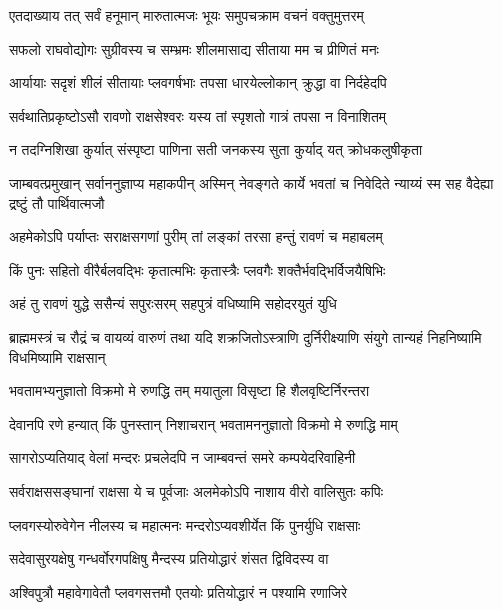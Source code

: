
\twolineshloka
{एतदाख्याय तत् सर्वं हनूमान् मारुतात्मजः}
{भूयः समुपचक्राम वचनं वक्तुमुत्तरम्} %

\twolineshloka
{सफलो राघवोद्योगः सुग्रीवस्य च सम्भ्रमः}
{शीलमासाद्य सीताया मम च प्रीणितं मनः} %

\twolineshloka
{आर्यायाः सदृशं शीलं सीतायाः प्लवगर्षभाः}
{तपसा धारयेल्लोकान् क्रुद्धा वा निर्दहेदपि} %

\twolineshloka
{सर्वथातिप्रकृष्टोऽसौ रावणो राक्षसेश्वरः}
{यस्य तां स्पृशतो गात्रं तपसा न विनाशितम्} %

\twolineshloka
{न तदग्निशिखा कुर्यात् संस्पृष्टा पाणिना सती}
{जनकस्य सुता कुर्याद् यत् क्रोधकलुषीकृता} %

\threelineshloka
{जाम्बवत्प्रमुखान् सर्वाननुज्ञाप्य महाकपीन्}
{अस्मिन् नेवङ्गते कार्ये भवतां च निवेदिते}
{न्याय्यं स्म सह वैदेह्या द्रष्टुं तौ पार्थिवात्मजौ} %

\twolineshloka
{अहमेकोऽपि पर्याप्तः सराक्षसगणां पुरीम्}
{तां लङ्कां तरसा हन्तुं रावणं च महाबलम्} %

\twolineshloka
{किं पुनः सहितो वीरैर्बलवद्भिः कृतात्मभिः}
{कृतास्त्रैः प्लवगैः शक्तैर्भवद्भिर्विजयैषिभिः} %

\twolineshloka
{अहं तु रावणं युद्धे ससैन्यं सपुरःसरम्}
{सहपुत्रं वधिष्यामि सहोदरयुतं युधि} %

\threelineshloka
{ब्राह्ममस्त्रं च रौद्रं च वायव्यं वारुणं तथा}
{यदि शक्रजितोऽस्त्राणि दुर्निरीक्ष्याणि संयुगे}
{तान्यहं निहनिष्यामि विधमिष्यामि राक्षसान्} %

\twolineshloka
{भवतामभ्यनुज्ञातो विक्रमो मे रुणद्धि तम्}
{मयातुला विसृष्टा हि शैलवृष्टिर्निरन्तरा} %

\twolineshloka
{देवानपि रणे हन्यात् किं पुनस्तान् निशाचरान्}
{भवतामननुज्ञातो विक्रमो मे रुणद्धि माम्} %

\twolineshloka
{सागरोऽप्यतियाद् वेलां मन्दरः प्रचलेदपि}
{न जाम्बवन्तं समरे कम्पयेदरिवाहिनी} %

\twolineshloka
{सर्वराक्षससङ्घानां राक्षसा ये च पूर्वजाः}
{अलमेकोऽपि नाशाय वीरो वालिसुतः कपिः} %

\twolineshloka
{प्लवगस्योरुवेगेन नीलस्य च महात्मनः}
{मन्दरोऽप्यवशीर्येत किं पुनर्युधि राक्षसाः} %

\twolineshloka
{सदेवासुरयक्षेषु गन्धर्वोरगपक्षिषु}
{मैन्दस्य प्रतियोद्धारं शंसत द्विविदस्य वा} %

\twolineshloka
{अश्विपुत्रौ महावेगावेतौ प्लवगसत्तमौ}
{एतयोः प्रतियोद्धारं न पश्यामि रणाजिरे} %

